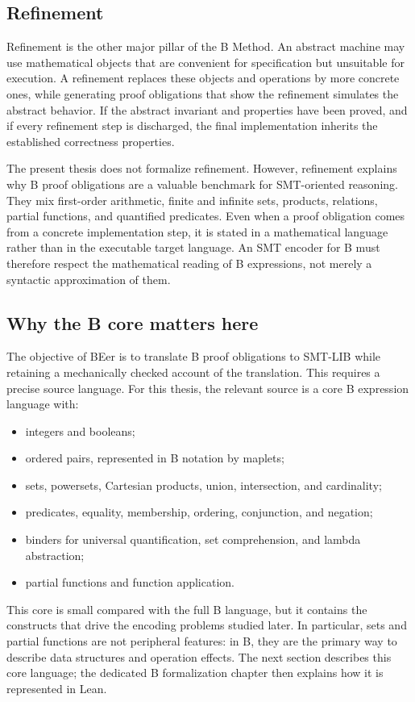 \subsection{Refinement}

Refinement is the other major pillar of the B Method.
An abstract machine may use mathematical objects that are convenient for specification but unsuitable for execution.
A refinement replaces these objects and operations by more concrete ones, while generating proof obligations that show the refinement simulates the abstract behavior.
If the abstract invariant and properties have been proved, and if every refinement step is discharged, the final implementation inherits the established correctness properties.

The present thesis does not formalize refinement.
However, refinement explains why B proof obligations are a valuable benchmark for SMT-oriented reasoning.
They mix first-order arithmetic, finite and infinite sets, products, relations, partial functions, and quantified predicates.
Even when a proof obligation comes from a concrete implementation step, it is stated in a mathematical language rather than in the executable target language.
An SMT encoder for B must therefore respect the mathematical reading of B expressions, not merely a syntactic approximation of them.

\subsection{Why the B core matters here}

The objective of BEer is to translate B proof obligations to SMT-LIB while retaining a mechanically checked account of the translation.
This requires a precise source language.
For this thesis, the relevant source is a core B expression language with:
\begin{itemize}
  \item integers and booleans;
  \item ordered pairs, represented in B notation by maplets;
  \item sets, powersets, Cartesian products, union, intersection, and cardinality;
  \item predicates, equality, membership, ordering, conjunction, and negation;
  \item binders for universal quantification, set comprehension, and lambda abstraction;
  \item partial functions and function application.
\end{itemize}

This core is small compared with the full B language, but it contains the constructs that drive the encoding problems studied later.
In particular, sets and partial functions are not peripheral features: in B, they are the primary way to describe data structures and operation effects.
The next section describes this core language; the dedicated B formalization chapter then explains how it is represented in Lean.
